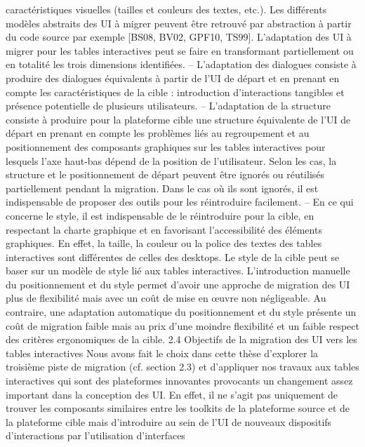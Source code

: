 \documentclass{article}
\begin{document}
caract\'{e}ristiques visuelles (tailles et couleurs des textes, etc.). Les diff\'{e}rents mod\`{e}les abstraits des UI
\`{a} migrer peuvent \^{e}tre retrouv\'{e} par abstraction \`{a} partir du code source par exemple [BS08, BV02,
GPF10, TS99].
L’adaptation des UI \`{a} migrer pour les tables interactives peut se faire en transformant partiellement
ou en totalit\'{e} les trois dimensions identiﬁ\'{e}es.
– L’adaptation des dialogues consiste \`{a} produire des dialogues \'{e}quivalents \`{a} partir de l’UI de
d\'{e}part et en prenant en compte les caract\'{e}ristiques de la cible : introduction d’interactions tangibles et pr\'{e}sence potentielle de plusieurs utilisateurs.
– L’adaptation de la structure consiste \`{a} produire pour la plateforme cible une structure \'{e}quivalente de l’UI de d\'{e}part en prenant en compte les probl\`{e}mes li\'{e}s au regroupement et au positionnement des composants graphiques sur les tables interactives pour lesquels l’axe haut-bas
d\'{e}pend de la position de l’utilisateur. Selon les cas, la structure et le positionnement de d\'{e}part
peuvent \^{e}tre ignor\'{e}s ou r\'{e}utilis\'{e}s partiellement pendant la migration. Dans le cas o\`{u} ils sont
ignor\'{e}s, il est indispensable de proposer des outils pour les r\'{e}introduire facilement.
– En ce qui concerne le style, il est indispensable de le r\'{e}introduire pour la cible, en respectant la
charte graphique et en favorisant l’accessibilit\'{e} des \'{e}l\'{e}ments graphiques. En effet, la taille, la
couleur ou la police des textes des tables interactives sont diff\'{e}rentes de celles des desktops. Le
style de la cible peut se baser sur un mod\`{e}le de style li\'{e} aux tables interactives.
L’introduction manuelle du positionnement et du style permet d’avoir une approche de migration
des UI plus de ﬂexibilit\'{e} mais avec un co\^{u}t de mise en œuvre non n\'{e}gligeable. Au contraire, une
adaptation automatique du positionnement et du style pr\'{e}sente un co\^{u}t de migration faible mais au
prix d’une moindre ﬂexibilit\'{e} et un faible respect des crit\`{e}res ergonomiques de la cible.
2.4
Objectifs de la migration des UI vers les tables interactives
Nous avons fait le choix dans cette th\`{e}se d’explorer la troisi\`{e}me piste de migration (cf. section 2.3)
et d’appliquer nos travaux aux tables interactives qui sont des plateformes innovantes provocants
un changement assez important dans la conception des UI. En effet, il ne s’agit pas uniquement de
trouver les composants similaires entre les toolkits de la plateforme source et de la plateforme cible
mais d’introduire au sein de l’UI de nouveaux dispositifs d’interactions par l’utilisation d’interfaces
\end{document}

